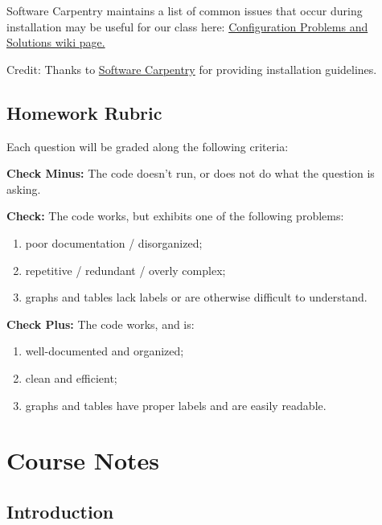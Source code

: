 \documentclass[]{book}
\providecommand{\tightlist}{%
  \setlength{\itemsep}{0pt}\setlength{\parskip}{0pt}}
\begin{document}
Software Carpentry maintains a list of common issues that occur during installation may be useful for our class here: \href{https://github.com/swcarpentry/workshop-template/wiki/Configuration-Problems-and-Solutions}{Configuration Problems and Solutions wiki page.}

Credit: Thanks to \href{http://software-carpentry.org/workshops/}{Software Carpentry} for providing installation guidelines.

\hypertarget{homework-rubric}{%
\chapter{Homework Rubric}\label{homework-rubric}}

Each question will be graded along the following criteria:

\textbf{Check Minus:} The code doesn't run, or does not do what the question is asking.

\textbf{Check:} The code works, but exhibits one of the following problems:

\begin{enumerate}
\def\labelenumi{\arabic{enumi})}
\tightlist
\item
  poor documentation / disorganized;
\item
  repetitive / redundant / overly complex;
\item
  graphs and tables lack labels or are otherwise difficult to understand.
\end{enumerate}

\textbf{Check Plus:} The code works, and is:

\begin{enumerate}
\def\labelenumi{\arabic{enumi})}
\tightlist
\item
  well-documented and organized;
\item
  clean and efficient;
\item
  graphs and tables have proper labels and are easily readable.
\end{enumerate}

\hypertarget{part-course-notes}{%
\part{Course Notes}\label{part-course-notes}}

\hypertarget{introduction}{%
\chapter{Introduction}\label{introduction}}
\end{document}
